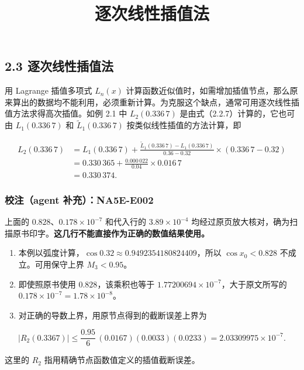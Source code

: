 \documentclass[
  10pt,
  fontset=fandol]{ctexart}
\title{逐次线性插值法}
\author{}
\date{}
\providecommand{\tightlist}{%
  \setlength{\itemsep}{0pt}\setlength{\parskip}{0pt}}
\begin{document}
\maketitle

\subsection{2.3 逐次线性插值法}\label{ux9010ux6b21ux7ebfux6027ux63d2ux503cux6cd5}

用 Lagrange 插值多项式 \(L_n(x)\) 计算函数近似值时，如需增加插值节点，那么原来算出的数据均不能利用，必须重新计算。为克服这个缺点，通常可用逐次线性插值方法求得高次插值。如例 2.1 中 \(L_2(0.336\,7)\) 是由式（2.2.7）计算的，它也可由 \(L_1(0.336\,7)\) 和 \(\widetilde L_1(0.336\,7)\) 按类似线性插值的方法计算，即

\[
\begin{aligned}
L_2(0.336\,7)
&=L_1(0.336\,7)
+\frac{\widetilde L_1(0.336\,7)-L_1(0.336\,7)}{0.36-0.32}
\times(0.336\,7-0.32)\\
&=0.330\,365+\frac{0.000\,022}{0.04}\times0.016\,7\\
&=0.330\,374.
\end{aligned}
\]

\subsubsection{校注（agent 补充）：NA5E-E002}\label{ux6821ux6ce8agent-ux8865ux5145na5e-e002}

上面的 \(0.828\)、\(0.178\times10^{-7}\) 和代入行的 \(3.89\times10^{-4}\) 均经过原页放大核对，确为扫描原书印字。\textbf{这几行不能直接作为正确的数值结果使用。}

\begin{enumerate}
\def\labelenumi{\arabic{enumi}.}
\tightlist
\item
  本例以弧度计算，\(\cos0.32\approx0.9492354180824409\)，所以 \(\cos x_0<0.828\) 不成立。可用保守上界 \(M_3<0.95\)。
\item
  即使照原书使用 \(0.828\)，该乘积也等于 \(1.77200694\times10^{-7}\)，大于原文所写的 \(0.178\times10^{-7}=1.78\times10^{-8}\)。
\item
  对正确的导数上界，用原节点得到的截断误差上界为
\end{enumerate}

\[
|R_2(0.3367)|
\le\frac{0.95}{6}\,(0.0167)(0.0033)(0.0233)
=2.03309975\times10^{-7}.
\]

这里的 \(R_2\) 指用精确节点函数值定义的插值截断误差。
\end{document}
